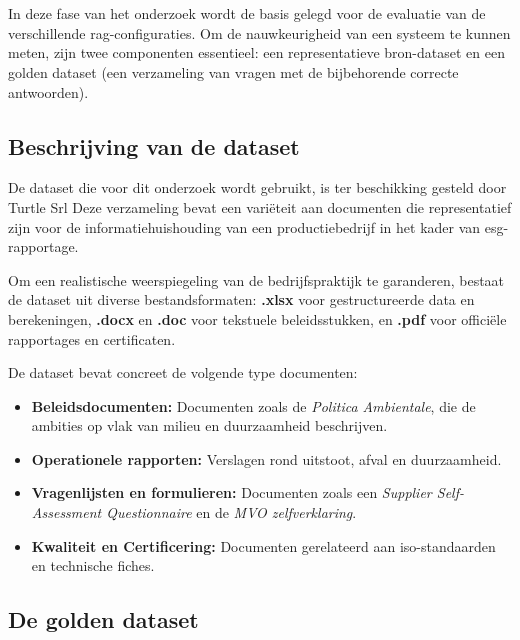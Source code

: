 \chapter{}%
\label{ch:data-goldenset}

In deze fase van het onderzoek wordt de basis gelegd voor de evaluatie van de verschillende \gls{rag}-configuraties. Om de nauwkeurigheid van een systeem te kunnen meten, zijn twee componenten essentieel: een representatieve bron-dataset en een golden dataset (een verzameling van vragen met de bijbehorende correcte antwoorden).

\section{Beschrijving van de dataset}
\label{sec:dataset-beschrijving}

De dataset die voor dit onderzoek wordt gebruikt, is ter beschikking gesteld door Turtle Srl Deze verzameling bevat een variëteit aan documenten die representatief zijn voor de informatiehuishouding van een productiebedrijf in het kader van \gls{esg}-rapportage.

Om een realistische weerspiegeling van de bedrijfspraktijk te garanderen, bestaat de dataset uit diverse bestandsformaten: \textbf{.xlsx} voor gestructureerde data en berekeningen, \textbf{.docx} en \textbf{.doc} voor tekstuele beleidsstukken, en \textbf{.pdf} voor officiële rapportages en certificaten.

De dataset bevat concreet de volgende type documenten:

\begin{itemize}
    \item \textbf{Beleidsdocumenten:} Documenten zoals de \textit{Politica Ambientale}, die de ambities op vlak van milieu en duurzaamheid beschrijven.
    \item \textbf{Operationele rapporten:} Verslagen rond uitstoot, afval en duurzaamheid.
    \item \textbf{Vragenlijsten en formulieren:} Documenten zoals een \textit{Supplier Self-Assessment Questionnaire} en de \textit{MVO zelfverklaring}.
    \item \textbf{Kwaliteit en Certificering:} Documenten gerelateerd aan \gls{iso}-standaarden en technische fiches.
\end{itemize}

\section{De golden dataset}

